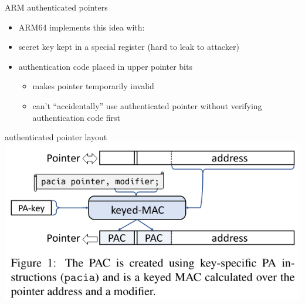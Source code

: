 \begin{frame}{ARM authenticated pointers}
    \begin{itemize}
    \item ARM64 implements this idea with:
    \vspace{.5cm}
    \item secret key kept in a special register (hard to leak to attacker)
    \item authentication code placed in upper pointer bits
        \begin{itemize}
        \item makes pointer temporarily invalid
        \item can't ``accidentally'' use authenticated pointer without verifying authentication code first
        \end{itemize}
    \end{itemize}
\end{frame}

\begin{frame}[fragile]{authenticated pointer layout}
\includegraphics[width=\textwidth]{../cfi/arm-enc-ptr-fig}
\end{frame}


